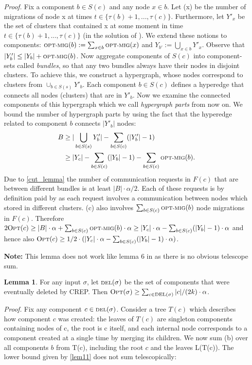 \documentclass[xcolor=dvipsnames, tikz, 12pt]{article}
\newcommand{\nl}{\newline}
\newcommand{\crep}{C{\scriptsize REP}}
\newcommand{\optmig}{\text{\scriptsize OPT-MIG}}
\newcommand{\del}{\text{\scriptsize DEL}}
\newcommand{\opt}{\text{O{\scriptsize PT}}}
\theoremstyle{definition}
\newtheorem{lemma}[defi]{Lemma}
\begin{document}
	\textit{Proof.} Fix a component $b\in S(c)$ and any node $x\in b$. Let \optmig(x) be the number of \opt migrations of node x at times $t\in\{\tau(b)+1,...,\tau(c)\}$. Furthermore, let $Y'_x$ be the set of clusters that contained x at some moment in time $t\in\{\tau(b)+1,...,\tau(c)\}$ (in the solution of \opt). We extend these notions to components: $\optmig{}(b):=\sum_{x\in b}\optmig(x)$ and $Y_{b'}:=\bigcup_{x\in b}Y'_x$. Observe that $|Y_b'|\leq|Y_b|+\optmig(b)$.\nl
	Now aggregate components of $S(c)$ into component-sets called \textit{bundles}, so that any two bundles always have their nodes in disjoint clusters. To achieve this, we construct a hypergraph, whose nodes correspond to clusters from $\cup_{b\in S(s)}Y'_b$. Each component $b\in S(c)$ defines a hyperedge that connects all nodes (clusters) that are in $Y'_b$. Now we examine the connected components of this hypergraph which we call  \textit{hypergraph parts} from now on.
	We bound the number of hypergraph parts by using the fact that the hyperedge related to component $b$ connects $|Y'_b|$ nodes:
	\begin{align*}
		B&\geq|\bigcup_{b\in S(s)}Y'_b|-\sum_{b\in S(c)}(|Y'_b|-1)\\
		&\geq|Y_c|-\sum_{b\in S(c)}(|Y_b|-1)-\sum_{b\in S(c)}\optmig(b).
	\end{align*}
	Due to \cref{cut_lemma} the number of communication requests in $F(c)$ that are between different bundles is at least $|B|\cdot\alpha/2$. Each of these requests is by definition paid by \opt as each request involves a communication between nodes which \opt stored in different clusters.
	\opt(c) also involves $\sum_{b\in S(c)}\optmig(b)$ node migrations in $F(c)$.\nl
	Therefore $2\opt{}(c)\geq|B|\cdot\alpha+\sum_{b\in S(c)}\optmig(b)\cdot\alpha\geq|Y_c|\cdot\alpha-\sum_{b\in S(c)}(|Y_b|-1)\cdot\alpha$ and hence also
	$\opt(c)\geq1/2\cdot(|Y_c|\cdot\alpha-\sum_{b\in S(c)}(|Y_b|-1)\cdot\alpha)$.\nl

\textbf{Note:} This lemma does not work like lemma 6 in \cite{Avin2015} as there is no obvious telescope sum.
	\begin{lemma}
		For any input $\sigma$, let $\del(\sigma)$ be the set of components that were eventually deleted by \crep{}. Then $\opt(\sigma)\geq\sum_{c\in\del(\sigma)}|c|/(2k)\cdot\alpha$.
	\end{lemma}
	\textit{Proof.} Fix any component $c\in\del(\sigma)$. Consider a tree $T(c)$ which describes how component $c$ was created: the leaves of $T(c)$ are singleton components containing nodes of c, the root is c itself, and each internal node corresponds to a component created at a single time by merging its children.
	We now sum \opt(b) over all components $b$ from T(c), including the root $c$ and the leaves L(T(c)).
	The lower bound given by \cref{lem11} does not sum telescopically:
\end{document}
